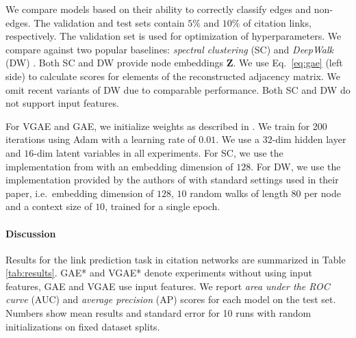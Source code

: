 \documentclass{article}
\begin{document}
We compare models based on their ability to correctly classify edges and non-edges. The validation and test sets contain $5\%$ and $10\%$ of citation links, respectively. The validation set is used for optimization of hyperparameters. We compare against two popular baselines: \emph{spectral clustering} (SC) \cite{tang2011leveraging} and \emph{DeepWalk} (DW) \cite{perozzi2014deepwalk}. Both SC and DW provide node embeddings $\mathbf{Z}$. We use Eq.~\ref{eq:gae} (left side) to calculate scores for elements of the reconstructed adjacency matrix. We omit recent variants of DW \cite{tang2015line, grovernode2vec} due to comparable performance. Both SC and DW do not support input features.

For VGAE and GAE, we initialize weights as described in \cite{glorot2010understanding}. We train for 200 iterations using Adam \cite{kingma2014adam} with a learning rate of $0.01$. We use a $32$-dim hidden layer and $16$-dim latent variables in all experiments. For SC, we use the implementation from \cite{scikit-learn} with an embedding dimension of $128$. For DW, we use the implementation provided by the authors of \cite{grovernode2vec} with standard settings used in their paper, i.e.~embedding dimension of $128$, $10$ random walks of length $80$ per node and a context size of $10$, trained for a single epoch.

\paragraph{Discussion}
Results for the link prediction task in citation networks are summarized in Table \ref{tab:results}. GAE* and VGAE* denote experiments without using input features, GAE and VGAE use input features. We report \emph{area under the ROC curve} (AUC) and \emph{average precision} (AP) scores for each model on the test set. Numbers show mean results and standard error for 10 runs with random initializations on fixed dataset splits.
\end{document}
